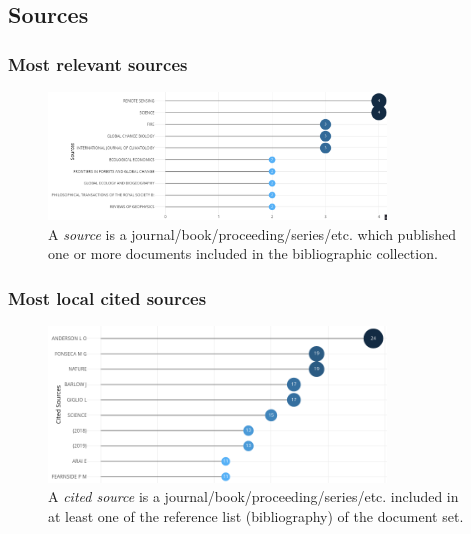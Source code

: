 \documentclass[aspectratio=169]{beamer}
\begin{document}
\subsection{Sources}

\begin{frame}
  \frametitle{Most relevant sources}
  \begin{figure}
    \centering
    \includegraphics[width=0.8\textwidth]{img/most_relevant_sources.png}
    \caption{A \emph{source} is a journal/book/proceeding/series/etc. which published 
    one or more documents included in the bibliographic collection.} 
    \label{fig:most_relevant_sources}
  \end{figure}
\end{frame}

\begin{frame}
  \frametitle{Most local cited sources}
  \begin{figure}
    \centering
    \includegraphics[width=0.8\textwidth]{img/most_local_cited_sources.png}
    \caption{A \emph{cited source} is a journal/book/proceeding/series/etc. 
    included in at least one of the reference list (bibliography) of the 
    document set.}
    \label{fig:most_local_cited_sources}
  \end{figure}
\end{frame}
\end{document}

